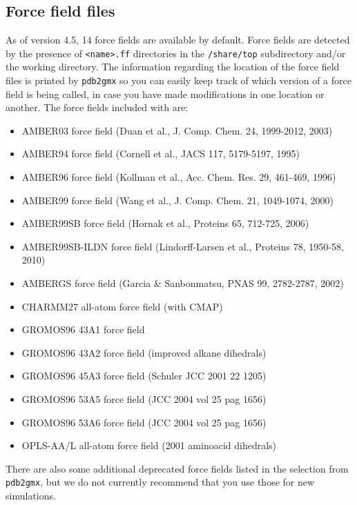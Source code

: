 \subsection{Force field files}
\label{subsec:fffiles}
As of {\gromacs} version 4.5, 14 force fields are available by default.
Force fields are detected by the presence of {\tt <name>.ff} directories
in the {\gromacs} {\tt /share/top} subdirectory and/or the working directory.  
The information regarding the location of the force field files is printed
by {\tt pdb2gmx} so you can easily keep track of which version of a force field
is being called, in case you have made modifications in one location or another.
The force fields included with {\gromacs} are:

{\small
\begin{itemize}
 \item AMBER03 force field (Duan et al., J. Comp. Chem. 24, 1999-2012, 2003) 
 \item AMBER94 force field (Cornell et al., JACS 117, 5179-5197, 1995) 
 \item AMBER96 force field (Kollman et al., Acc. Chem. Res. 29, 461-469, 1996) 
 \item AMBER99 force field (Wang et al., J. Comp. Chem. 21, 1049-1074, 2000) 
 \item AMBER99SB force field (Hornak et al., Proteins 65, 712-725, 2006) 
 \item AMBER99SB-ILDN force field (Lindorff-Larsen et al., Proteins 78, 1950-58, 2010) 
 \item AMBERGS force field (Garcia \& Sanbonmatsu, PNAS 99, 2782-2787, 2002) 
 \item CHARMM27 all-atom force field (with CMAP) 
 \item GROMOS96 43A1 force field 
 \item GROMOS96 43A2 force field (improved alkane dihedrals) 
 \item GROMOS96 45A3 force field (Schuler JCC 2001 22 1205) 
 \item GROMOS96 53A5 force field (JCC 2004 vol 25 pag 1656) 
 \item GROMOS96 53A6 force field (JCC 2004 vol 25 pag 1656) 
 \item OPLS-AA/L all-atom force field (2001 aminoacid dihedrals) 
\end{itemize}} 
 
There are also some additional deprecated force fields listed in the selection from
{\tt pdb2gmx}, but we do not currently recommend that you use those for new simulations.
 

